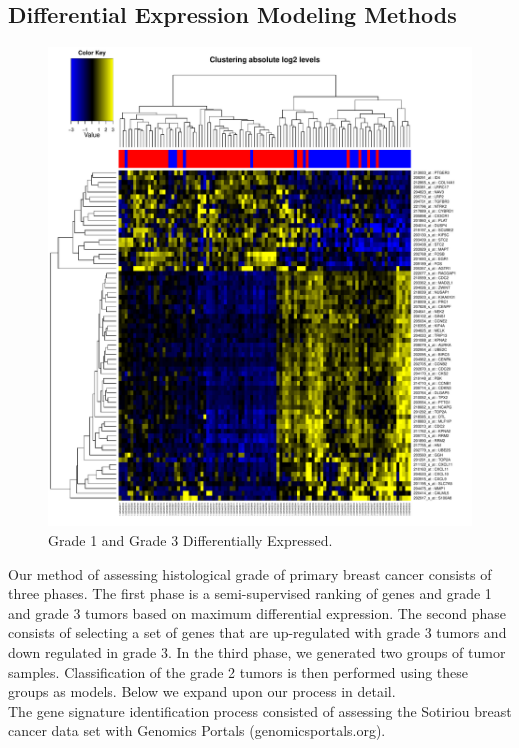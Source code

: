 \documentclass[a4paper,10pt]{article}
\begin{document}
\subsection{Differential Expression Modeling Methods}
\begin{figure}
\centering
\includegraphics[scale=0.43]{docs/grade1and3differentiallyexpressed}
\caption{Grade 1 and Grade 3 Differentially Expressed.}\label{grade13diff}
\end{figure}
Our method of assessing histological grade of primary breast cancer consists of three phases. The first phase is
a semi-supervised ranking of genes and grade 1 and grade 3 tumors based on maximum differential
expression. The second phase consists of selecting a set of genes that are up-regulated with 
grade 3 tumors and down regulated in grade 3. In the third phase, we generated two groups of tumor samples.
Classification of the grade 2 tumors is then performed using these groups as models. Below we expand upon
our process in detail.\\
The gene signature identification process consisted of assessing the Sotiriou breast cancer data set with Genomics Portals (genomicsportals.org).
\end{document}
